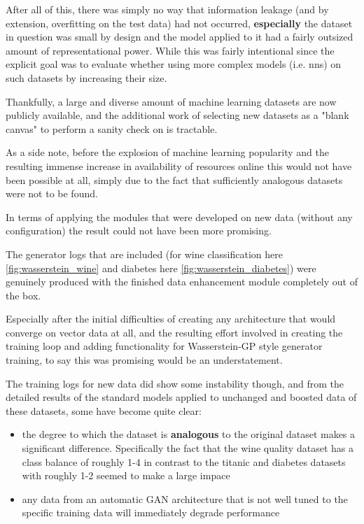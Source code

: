 After all of this, there was simply no way that information leakage (and by extension, overfitting on the test data) had not occurred, \textbf{especially} the dataset in question was small by design and the model applied to it had a fairly outsized amount of representational power. While this was fairly intentional since the explicit goal was to evaluate whether using more complex models (i.e. \acp{nn}) on such datasets by increasing their size.

Thankfully, a large and diverse amount of machine learning datasets are now publicly available, and the additional work of selecting new datasets as a "blank canvas" to perform a sanity check on is tractable. 

As a side note, before the explosion of machine learning popularity and the resulting immense increase in availability of resources online this would not have been possible at all, simply due to the fact that sufficiently analogous datasets were not to be found.

In terms of applying the modules that were developed on new data (without any configuration) the result could not have been more promising. 

The generator logs that are included (for wine classification here \ref{fig:wasserstein_wine} and diabetes here \ref{fig:wasserstein_diabetes}) were genuinely produced with the finished data enhancement module completely out of the box. 

Especially after the initial difficulties of creating any architecture that would converge on vector data at all, and the resulting effort involved in creating the training loop and adding functionality for Wasserstein-GP style generator training, to say this was promising would be an understatement.

The training logs for new data did show some instability though, and from the detailed results of the standard models applied to unchanged and boosted data of these datasets, some have become quite clear:

\begin{itemize}
	\item the degree to which the dataset is \textbf{analogous} to the original dataset makes a significant difference. Specifically the fact that the wine quality dataset has a class balance of roughly 1-4 in contrast to the titanic and diabetes datasets with roughly 1-2 seemed to make a large impace
	\item any data from an automatic \ac{GAN} architecture that is not well tuned to the specific training data will immediately degrade performance
\end{itemize} 

